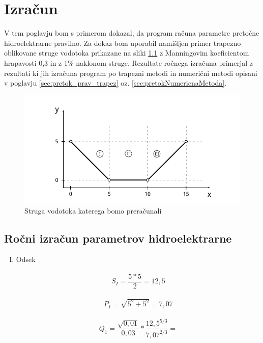 \chapter{Izračun}


V tem poglavju bom s primerom dokazal, da program računa parametre pretočne hidroelektrarne pravilno. Za dokaz bom uporabil namišljen primer trapezno oblikovane struge vodotoka prikazane na sliki \ref{fig:izracun_trapeznaStruga} z Manningovim koeficientom hrapavosti 0,3 in z 1\% naklonom struge. Rezultate ročnega izračuna primerjal z rezultati ki jih izračuna program po trapezni metodi in numerični metodi opisani v poglavju \ref{sec:pretok_prav_trapez}  oz. \ref{sec:pretokNumericnaMetoda}.



\begin{figure}[ht!]
	\begin{centering}
		\includegraphics[width=\textwidth]{slike/izracuni/trapeznaStruga.pdf}		
		\caption{Struga vodotoka katerega bomo preračunali}\label{fig:izracun_trapeznaStruga}
	\end{centering}
\end{figure}

\section{Ročni izračun parametrov hidroelektrarne}

\begin{enumerate}[I.]
	
	\item Odsek
	
		\begin{align}
			S_I = \dfrac{5 * 5}{2} = 12,5
		\end{align}
		
		\begin{align}
			P_I = \sqrt{5^2 + 5^2} = 7,07
		\end{align}
		
		\begin{align}
			Q_1 = \dfrac{\sqrt{0,01}}{0,03} * \dfrac{12,5^{5/3}}{7,07^{2/3}} = 
		\end{align}
	
	
\end{enumerate}


